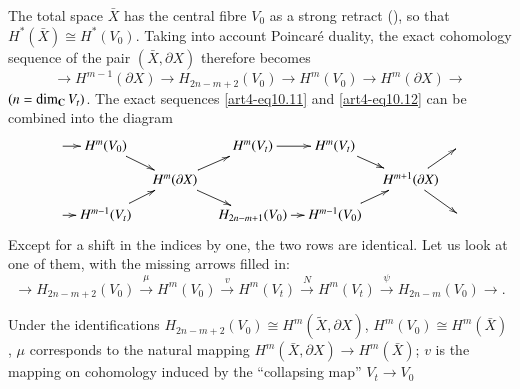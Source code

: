 The total space $\bar{X}$ has the central fibre $V_0$ as a strong retract (\cf \cite{art4-key8}), so that $H^\ast (\bar{X}) \cong H^\ast (V_0)$. Taking into account Poincar\'e duality, the exact cohomology sequence of the pair $(\bar{X}, \partial X)$ therefore becomes 
\begin{equation}\label{art4-eq10.12}
\longrightarrow H^{m-1} (\partial X) \longrightarrow H_{2n - m+2} (V_0) \longrightarrow  H^m (V_0) \longrightarrow  H^m (\partial X) \longrightarrow  
\end{equation}
$(n = \dim_{\mathbf{C}} V_t)$. The exact sequences \eqref{art4-eq10.11} and \eqref{art4-eq10.12} can be combined into the diagram
\begin{equation}
\vcenter{
\xymatrix@=.32cm{
\ar[r] & H^m (V_0)  \ar[dr] & & H^m (V_t) \ar[r] & H^m (V_t) \ar[dr] & & \\
&& H^m (\partial X) \ar[ur]\ar[dr] &&& H^{m+1} (\partial X) \ar[dr] \ar[ur] &\\
\ar[r] & H^{m-1} (V_t)  \ar[ur] & & H_{2n-m+1}  (V_0) \ar[r] & H^{m-1} (V_0) \ar[ur] & & 
}}
\end{equation}
Except for a shift in the indices by one, the two rows are identical. Let us look at one of them, with the missing arrows filled in:
\begin{equation}\label{art4-eq10.14}
\longrightarrow H_{2n-m+2} (V_0) \xrightarrow{\mu} H^m (V_0) \xrightarrow{v} H^m (V_t) \xrightarrow{N}  H^{m} (V_t) \xrightarrow{\psi}  H_{2n-m}  (V_0) \longrightarrow .
\end{equation}

Under the identifications $H_{2n - m +2 } (V_0) \cong H^m (\tilde{X}, \partial X)$, $H^m (V_0) \cong H^m (\bar{X})$, $\mu$ corresponds to the natural mapping $H^m (\bar{X}, \partial X) \to H^m (\bar{X})$; $v$ is the mapping on cohomology induced by the ``collapsing map'' $V_t \to V_0$\pageoriginale 












\begin{thebibliography}{99}
\end{thebibliography}





